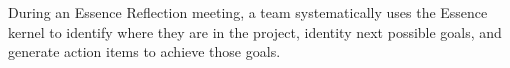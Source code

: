 \documentclass[preprint,12pt,3p]{elsarticle}
\begin{document}
During an Essence Reflection meeting, a team systematically uses the Essence kernel to identify where they are in the project, identity next possible goals, and generate action items to achieve those goals. 

\end{document}
